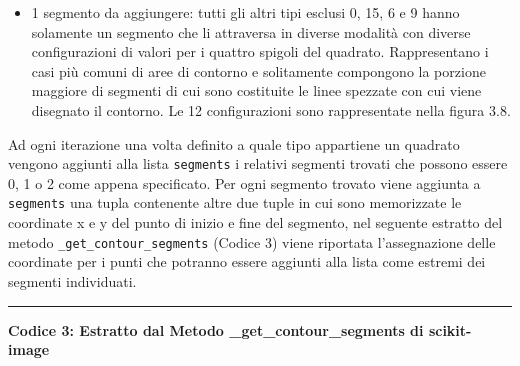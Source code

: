 \documentclass[12pt,a4paper]{report}
\begin{document}
\begin{itemize}
\item 1 segmento da aggiungere: tutti gli altri tipi esclusi 0, 15, 6 e 9 hanno solamente un segmento che li attraversa in diverse modalità con diverse configurazioni di valori per i quattro spigoli del quadrato.  Rappresentano i casi più comuni di aree di contorno e   solitamente compongono la porzione maggiore di segmenti di cui sono costituite le linee spezzate con cui viene disegnato il contorno. Le 12 configurazioni sono rappresentate nella figura 3.8.
\begin{figure}[H]
\centering
\begin{floatrow}[1]
\end{floatrow}
\end{figure}

\end{itemize}
Ad ogni iterazione una volta definito a quale tipo appartiene un quadrato vengono aggiunti alla lista \verb|segments| i relativi segmenti trovati che possono essere 0, 1 o 2 come appena specificato.  Per ogni segmento trovato viene aggiunta a  \verb|segments| una tupla contenente altre due tuple in cui sono memorizzate le coordinate x e y del punto di inizio e fine del segmento, nel seguente estratto del metodo  \verb|_get_contour_segments| (Codice 3) viene riportata l'assegnazione delle coordinate per i punti che potranno essere aggiunti alla lista come estremi dei segmenti individuati.\newpage
\noindent\rule[0.5ex]{\linewidth}{2pt}
\small{\textbf{Codice 3: Estratto dal Metodo \_get\_contour\_segments di scikit-image}} \\
\end{document}
